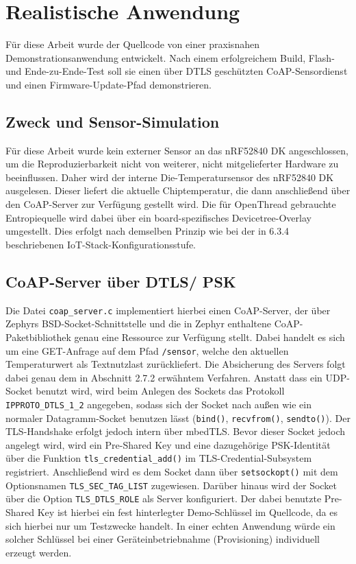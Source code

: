 \section{Realistische Anwendung}
F{\"u}r diese Arbeit wurde der Quellcode von einer praxisnahen Demonstrationsanwendung entwickelt. Nach einem erfolgreichem Build, Flash- und Ende-zu-Ende-Test soll sie einen {\"u}ber DTLS gesch{\"u}tzten CoAP-Sensordienst und einen Firmware-Update-Pfad demonstrieren.

\subsection{Zweck und Sensor-Simulation}
F{\"u}r diese Arbeit wurde kein externer Sensor an das nRF52840 DK angeschlossen, um die Reproduzierbarkeit nicht von weiterer, nicht mitgelieferter Hardware zu beeinflussen. Daher wird der interne Die-Temperatursensor des nRF52840 DK ausgelesen. Dieser liefert die aktuelle Chiptemperatur, die dann anschlie{\ss}end {\"u}ber den CoAP-Server zur Verf{\"u}gung gestellt wird. Die f{\"u}r OpenThread gebrauchte Entropiequelle wird dabei {\"u}ber ein board-spezifisches Devicetree-Overlay umgestellt. Dies erfolgt nach demselben Prinzip wie bei der in 6.3.4 beschriebenen IoT-Stack-Konfigurationsstufe.

\subsection{CoAP-Server {\"u}ber DTLS/ PSK}
Die Datei \lstinline[style=codeinline]|coap_server.c| implementiert hierbei einen CoAP-Server, der {\"u}ber Zephyrs BSD-Socket-Schnittstelle und die in Zephyr enthaltene CoAP-Paketbibliothek genau eine Ressource zur Verf{\"u}gung stellt. Dabei handelt es sich um eine GET-Anfrage auf dem Pfad \lstinline[style=codeinline]|/sensor|, welche den aktuellen Temperaturwert als Textnutzlast zur{\"u}ckliefert. Die Absicherung des Servers folgt dabei genau dem in Abschnitt 2.7.2 erw{\"a}hntem Verfahren. Anstatt dass ein UDP-Socket benutzt wird, wird beim Anlegen des Sockets das Protokoll \lstinline[style=codeinline]|IPPROTO_DTLS_1_2| angegeben, sodass sich der Socket nach au{\ss}en wie ein normaler Datagramm-Socket benutzen l{\"a}sst (\lstinline[style=codeinline]|bind()|, \lstinline[style=codeinline]|recvfrom()|, \lstinline[style=codeinline]|sendto()|). Der TLS-Handshake erfolgt jedoch intern {\"u}ber mbedTLS. Bevor dieser Socket jedoch angelegt wird, wird ein Pre-Shared Key und eine dazugeh{\"o}rige PSK-Identit{\"a}t {\"u}ber die Funktion \lstinline[style=codeinline]|tls_credential_add()| im TLS-Credential-Subsystem registriert. Anschlie{\ss}end wird es dem Socket dann {\"u}ber \lstinline[style=codeinline]|setsockopt()| mit dem Optionsnamen \lstinline[style=codeinline]|TLS_SEC_TAG_LIST| zugewiesen. Dar{\"u}ber hinaus wird der Socket {\"u}ber die Option \lstinline[style=codeinline]|TLS_DTLS_ROLE| als Server konfiguriert. Der dabei benutzte Pre-Shared Key ist hierbei ein fest hinterlegter Demo-Schl{\"u}ssel im Quellcode, da es sich hierbei nur um Testzwecke handelt. In einer echten Anwendung w{\"u}rde ein solcher Schl{\"u}ssel bei einer Ger{\"a}teinbetriebnahme (Provisioning) individuell erzeugt werden.

